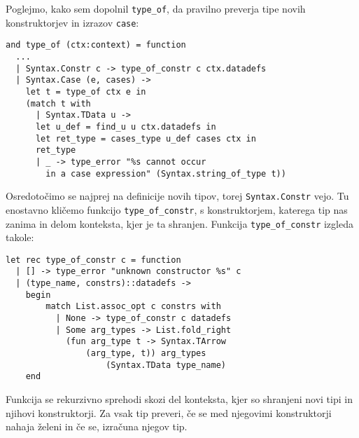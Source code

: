 \documentclass[12pt,a4paper,openany]{book}
\begin{document}
Poglejmo, kako sem dopolnil \lstinline{type_of}, da pravilno preverja tipe novih konstruktorjev in izrazov \lstinline{case}:
\begin{lstlisting}
and type_of (ctx:context) = function
  ...
  | Syntax.Constr c -> type_of_constr c ctx.datadefs
  | Syntax.Case (e, cases) -> 
    let t = type_of ctx e in
    (match t with
      | Syntax.TData u -> 
      let u_def = find_u u ctx.datadefs in
      let ret_type = cases_type u_def cases ctx in
      ret_type
      | _ -> type_error "%s cannot occur 
        in a case expression" (Syntax.string_of_type t))
\end{lstlisting}
Osredotočimo se najprej na definicije novih tipov, torej \lstinline{Syntax.Constr} vejo. Tu enostavno kličemo funkcijo \lstinline{type_of_constr}, s konstruktorjem, katerega tip nas zanima in delom 
konteksta, kjer je ta shranjen. Funkcija \lstinline{type_of_constr} izgleda takole:
\begin{lstlisting}
let rec type_of_constr c = function
  | [] -> type_error "unknown constructor %s" c
  | (type_name, constrs)::datadefs -> 
    begin
        match List.assoc_opt c constrs with
          | None -> type_of_constr c datadefs
          | Some arg_types -> List.fold_right 
            (fun arg_type t -> Syntax.TArrow 
                (arg_type, t)) arg_types 
                    (Syntax.TData type_name) 
    end
\end{lstlisting}
Funkcija se rekurzivno sprehodi skozi del konteksta, kjer so shranjeni novi tipi in njihovi konstruktorji. Za vsak tip preveri, če se med njegovimi konstruktorji nahaja želeni in če se, izračuna 
njegov tip. 
\end{document}

